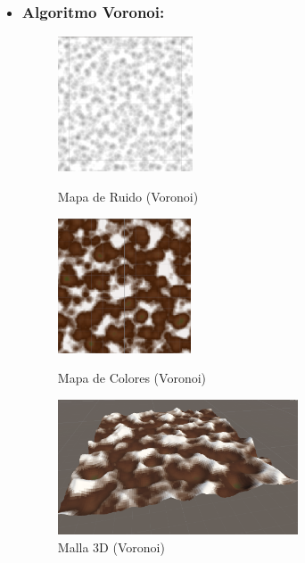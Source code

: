 \begin{itemize}
\begin{figure}[htbp]
    \end{figure}
    
    \item \subsubsection{Algoritmo Voronoi:}
    
    \begin{figure}[htbp]
        \begin{minipage}[t]{0.3\linewidth}
            \centering
            \includegraphics[width=\textwidth, height=4cm]{img/codes/Voronoi123.png}
            \caption{Mapa de Ruido (Voronoi)}
        \end{minipage}%
        \hfill
        \begin{minipage}[t]{0.3\linewidth}
            \centering
            \includegraphics[width=\textwidth, height=4cm]{img/codes/VoronoiColores.png}
            \caption{Mapa de Colores (Voronoi)}
        \end{minipage}%
        \hfill
        \begin{minipage}[t]{0.3\linewidth}
            \centering
            \includegraphics[width=\textwidth, height=4cm]{img/codes/Voronoi3D.png}
            \caption{Malla 3D (Voronoi)}
        \end{minipage}
        
    \end{figure}
\end{itemize}

